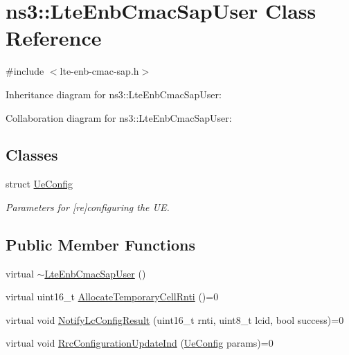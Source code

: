 \hypertarget{classns3_1_1LteEnbCmacSapUser}{}\section{ns3\+:\+:Lte\+Enb\+Cmac\+Sap\+User Class Reference}
\label{classns3_1_1LteEnbCmacSapUser}


{\ttfamily \#include $<$lte-\/enb-\/cmac-\/sap.\+h$>$}



Inheritance diagram for ns3\+:\+:Lte\+Enb\+Cmac\+Sap\+User\+:


Collaboration diagram for ns3\+:\+:Lte\+Enb\+Cmac\+Sap\+User\+:
\subsection*{Classes}
\begin{DoxyCompactItemize}
\item 
struct \hyperlink{structns3_1_1LteEnbCmacSapUser_1_1UeConfig}{Ue\+Config}
\begin{DoxyCompactList}\small\item\em Parameters for \mbox{[}re\mbox{]}configuring the UE. \end{DoxyCompactList}\end{DoxyCompactItemize}
\subsection*{Public Member Functions}
\begin{DoxyCompactItemize}
\item 
virtual \hyperlink{classns3_1_1LteEnbCmacSapUser_a29b7ea0bc1710eb746f8fe8487b99259}{$\sim$\+Lte\+Enb\+Cmac\+Sap\+User} ()
\item 
virtual uint16\+\_\+t \hyperlink{classns3_1_1LteEnbCmacSapUser_af022be8bca9d5d9969d9aced42a8793d}{Allocate\+Temporary\+Cell\+Rnti} ()=0
\item 
virtual void \hyperlink{classns3_1_1LteEnbCmacSapUser_ac49731752252aa7f2be14eab29331825}{Notify\+Lc\+Config\+Result} (uint16\+\_\+t rnti, uint8\+\_\+t lcid, bool success)=0
\item 
virtual void \hyperlink{classns3_1_1LteEnbCmacSapUser_a8f4da51dc1d210f48d07efc198e7d08a}{Rrc\+Configuration\+Update\+Ind} (\hyperlink{structns3_1_1LteEnbCmacSapUser_1_1UeConfig}{Ue\+Config} params)=0
\end{DoxyCompactItemize}


